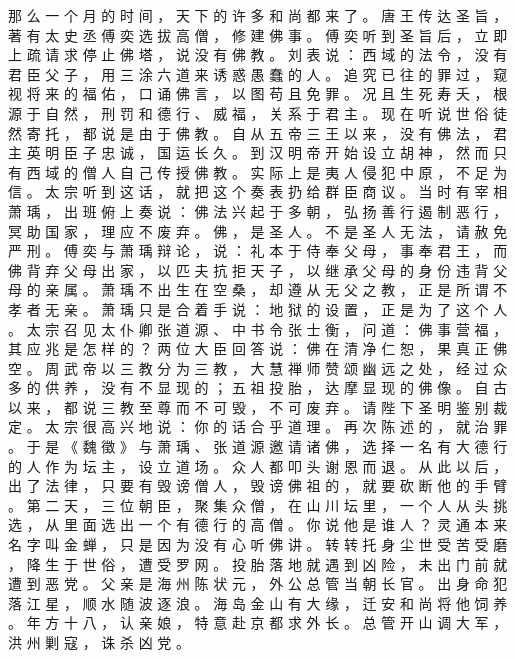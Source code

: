 {那 么 一 个 月 的 时 间 ， 天 下 的 许 多 和 尚 都 来 了 。
唐 王 传 达 圣 旨 ， 著 有 太 史 丞 傅 奕 选 拔 高 僧 ， 修 建 佛 事 。
傅 奕 听 到 圣 旨 后 ， 立 即 上 疏 请 求 停 止 佛 塔 ， 说 没 有 佛 教 。
刘 表 说 ： 西 域 的 法 令 ， 没 有 君 臣 父 子 ， 用 三 涂 六 道 来 诱 惑 愚 蠢 的 人 。
追 究 已 往 的 罪 过 ， 窥 视 将 来 的 福 佑 ， 口 诵 佛 言 ， 以 图 苟 且 免 罪 。
况 且 生 死 寿 夭 ， 根 源 于 自 然 ， 刑 罚 和 德 行 、 威 福 ， 关 系 于 君 主 。
现 在 听 说 世 俗 徒 然 寄 托 ， 都 说 是 由 于 佛 教 。
自 从 五 帝 三 王 以 来 ， 没 有 佛 法 ， 君 主 英 明 臣 子 忠 诚 ， 国 运 长 久 。
到 汉 明 帝 开 始 设 立 胡 神 ， 然 而 只 有 西 域 的 僧 人 自 己 传 授 佛 教 。
实 际 上 是 夷 人 侵 犯 中 原 ， 不 足 为 信 。
太 宗 听 到 这 话 ， 就 把 这 个 奏 表 扔 给 群 臣 商 议 。
当 时 有 宰 相 萧 瑀 ， 出 班 俯 上 奏 说 ： 佛 法 兴 起 于 多 朝 ， 弘 扬 善 行 遏 制 恶 行 ， 冥 助 国 家 ， 理 应 不 废 弃 。
佛 ， 是 圣 人 。
不 是 圣 人 无 法 ， 请 赦 免 严 刑 。
傅 奕 与 萧 瑀 辩 论 ， 说 ： 礼 本 于 侍 奉 父 母 ， 事 奉 君 王 ， 而 佛 背 弃 父 母 出 家 ， 以 匹 夫 抗 拒 天 子 ， 以 继 承 父 母 的 身 份 违 背 父 母 的 亲 属 。
萧 瑀 不 出 生 在 空 桑 ， 却 遵 从 无 父 之 教 ， 正 是 所 谓 不 孝 者 无 亲 。
萧 瑀 只 是 合 着 手 说 ： 地 狱 的 设 置 ， 正 是 为 了 这 个 人 。
太 宗 召 见 太 仆 卿 张 道 源 、 中 书 令 张 士 衡 ， 问 道 ： 佛 事 营 福 ， 其 应 兆 是 怎 样 的 ？
两 位 大 臣 回 答 说 ： 佛 在 清 净 仁 恕 ， 果 真 正 佛 空 。
周 武 帝 以 三 教 分 为 三 教 ， 大 慧 禅 师 赞 颂 幽 远 之 处 ， 经 过 众 多 的 供 养 ， 没 有 不 显 现 的 ； 五 祖 投 胎 ， 达 摩 显 现 的 佛 像 。
自 古 以 来 ， 都 说 三 教 至 尊 而 不 可 毁 ， 不 可 废 弃 。
请 陛 下 圣 明 鉴 别 裁 定 。
太 宗 很 高 兴 地 说 ： 你 的 话 合 乎 道 理 。
再 次 陈 述 的 ， 就 治 罪 。
于 是 《 魏 徵 》 与 萧 瑀 、 张 道 源 邀 请 诸 佛 ， 选 择 一 名 有 大 德 行 的 人 作 为 坛 主 ， 设 立 道 场 。
众 人 都 叩 头 谢 恩 而 退 。
从 此 以 后 ， 出 了 法 律 ， 只 要 有 毁 谤 僧 人 ， 毁 谤 佛 祖 的 ， 就 要 砍 断 他 的 手 臂 。
第 二 天 ， 三 位 朝 臣 ， 聚 集 众 僧 ， 在 山 川 坛 里 ， 一 个 人 从 头 挑 选 ， 从 里 面 选 出 一 个 有 德 行 的 高 僧 。
你 说 他 是 谁 人 ？ 灵 通 本 来 名 字 叫 金 蝉 ， 只 是 因 为 没 有 心 听 佛 讲 。
转 转 托 身 尘 世 受 苦 受 磨 ， 降 生 于 世 俗 ， 遭 受 罗 网 。
投 胎 落 地 就 遇 到 凶 险 ， 未 出 门 前 就 遭 到 恶 党 。
父 亲 是 海 州 陈 状 元 ， 外 公 总 管 当 朝 长 官 。
出 身 命 犯 落 江 星 ， 顺 水 随 波 逐 浪 。
海 岛 金 山 有 大 缘 ， 迁 安 和 尚 将 他 饲 养 。
年 方 十 八 ， 认 亲 娘 ， 特 意 赴 京 都 求 外 长 。
总 管 开 山 调 大 军 ， 洪 州 剿 寇 ， 诛 杀 凶 党 。
}
